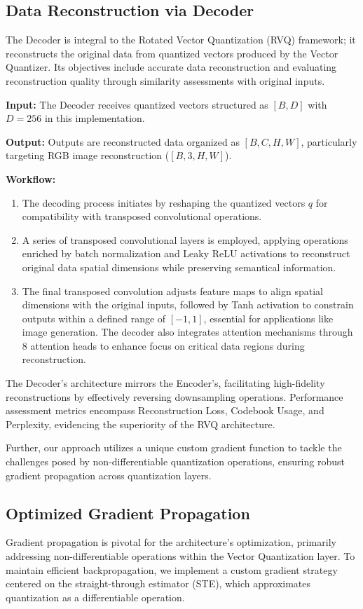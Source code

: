 \subsection{Data Reconstruction via Decoder}
The Decoder is integral to the Rotated Vector Quantization (RVQ) framework; it reconstructs the original data from quantized vectors produced by the Vector Quantizer. Its objectives include accurate data reconstruction and evaluating reconstruction quality through similarity assessments with original inputs.

\textbf{Input:} The Decoder receives quantized vectors structured as \([B, D]\) with \(D = 256\) in this implementation.

\textbf{Output:} Outputs are reconstructed data organized as \([B, C, H, W]\), particularly targeting RGB image reconstruction (\([B, 3, H, W]\)).

\textbf{Workflow:}
\begin{enumerate}
    \item The decoding process initiates by reshaping the quantized vectors \(q\) for compatibility with transposed convolutional operations.
    \item A series of transposed convolutional layers is employed, applying operations enriched by batch normalization and Leaky ReLU activations to reconstruct original data spatial dimensions while preserving semantical information.
    \item The final transposed convolution adjusts feature maps to align spatial dimensions with the original inputs, followed by Tanh activation to constrain outputs within a defined range of \([-1, 1]\), essential for applications like image generation. The decoder also integrates attention mechanisms through \(8\) attention heads to enhance focus on critical data regions during reconstruction.
\end{enumerate}

The Decoder's architecture mirrors the Encoder's, facilitating high-fidelity reconstructions by effectively reversing downsampling operations. Performance assessment metrics encompass Reconstruction Loss, Codebook Usage, and Perplexity, evidencing the superiority of the RVQ architecture.

Further, our approach utilizes a unique custom gradient function to tackle the challenges posed by non-differentiable quantization operations, ensuring robust gradient propagation across quantization layers.

\subsection{Optimized Gradient Propagation}
Gradient propagation is pivotal for the architecture's optimization, primarily addressing non-differentiable operations within the Vector Quantization layer. To maintain efficient backpropagation, we implement a custom gradient strategy centered on the straight-through estimator (STE), which approximates quantization as a differentiable operation.

